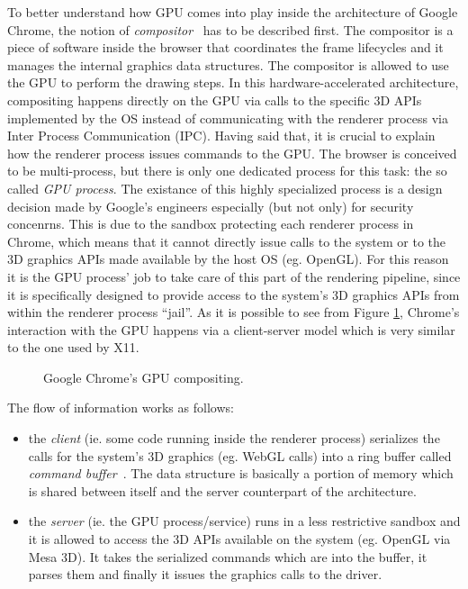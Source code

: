 To better understand how GPU comes into play inside the architecture of Google
Chrome, the notion of \emph{compositor}~\cite{gpucompositing} has to be described first.
The compositor is a piece of software inside the browser that coordinates the frame
lifecycles and it manages the internal graphics data structures. The compositor
is allowed to use the GPU to perform the drawing steps. In this hardware-accelerated
architecture, compositing happens directly on the GPU via calls to the specific 3D
APIs implemented by the OS instead of communicating with the renderer process via
Inter Process Communication (IPC).
Having said that, it is crucial to explain how the renderer process issues
commands to the GPU. The browser is conceived to be multi-process, but
there is only one dedicated process for this task: the so called \emph{GPU process}.
The existance of this highly specialized process is a design decision made by Google's
engineers especially (but not only) for security concenrns. This is due to the
sandbox protecting each renderer process in Chrome, which means that it cannot
directly issue calls to the system or to the 3D graphics APIs
made available by the host OS (eg. OpenGL). For this reason it is the GPU process' job
to take care of this part of the rendering pipeline, since it is specifically
designed to provide access to the system's 3D graphics APIs from within the renderer
process ``jail''.
As it is possible to see from Figure \ref{img:chrome_gpu_compositing}, Chrome's
interaction with the GPU happens via a client-server model which is very similar
to the one used by X11.
\begin{figure}[!htb]
    \caption{Google Chrome's GPU compositing.}
    \label{img:chrome_gpu_compositing}
\end{figure}

The flow of information works as follows:
\begin{itemize}
    \item the \emph{client} (ie. some code running inside the renderer process) serializes
        the calls for the system's 3D graphics (eg. WebGL calls) into a ring buffer called
        \emph{command buffer}~\cite{gpucommandbffer}. The data structure is basically a
        portion of memory which is shared between itself and the server counterpart of
        the architecture.
    \item the \emph{server} (ie. the GPU process/service) runs in a less restrictive sandbox
        and it is allowed to access the 3D APIs available on the system (eg. OpenGL via Mesa 3D).
        It takes the serialized commands which are into the buffer, it parses them and finally
        it issues the graphics calls to the driver.
\end{itemize}

